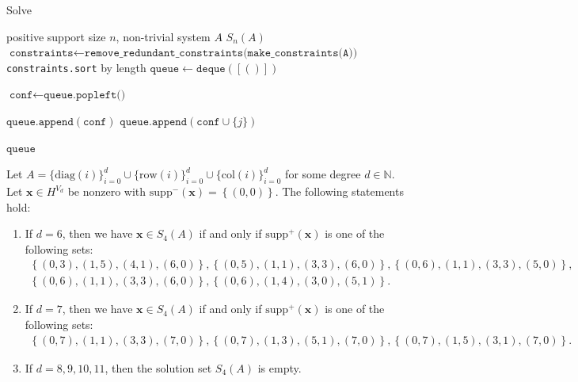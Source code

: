 \begin{algorithm}
\caption{Solve}
\label{alg:solve}
\begin{algorithmic}[1]
\Require positive support size \( n \), non-trivial system \( A \)
\Ensure \( S_n(A) \)
\State $\texttt{constraints} \gets \texttt{remove\_redundant\_constraints(make\_constraints(A))}$
\State \texttt{constraints.sort} by length
\State $\texttt{queue} \gets \texttt{deque}([()])$

        \State $\texttt{conf} \gets \texttt{queue.popleft()}$

            \State $\texttt{queue.append}(\texttt{conf})$
                \State $\texttt{queue.append}(\texttt{conf} \cup \{j\})$
            \EndFor
        \EndIf
    \EndFor
\EndFor

\State \Return $ \texttt{queue}$
\end{algorithmic}
\end{algorithm}
    

\begin{proposition}
    Let $A = \{ \mathrm{diag}(i) \}_{i=0}^d \cup \{ \mathrm{row}(i)\}^d_{i=0} \cup \{ \mathrm{col}(i) \}^d_{i=0}$ for some degree \( d \in \mathbb{N} \). Let \( \mathbf{x} \in H^{V_d} \) be nonzero with \( \mathrm{supp}^-(\mathbf{x}) = \left\{ (0,0) \right\} \). The following statements hold:

    \begin{enumerate}
        \item If \( d = 6 \), then we have \( \mathbf{x} \in S_4(A) \) if and only if \( \mathrm{supp}^+(\mathbf{x}) \) is one of the following sets:
        \begin{gather*}
            \left\{ (0,3), (1,5), (4,1), (6,0) \right\},
            \left\{ (0,5), (1,1), (3,3), (6,0) \right\},
            \left\{ (0,6), (1,1), (3,3), (5,0) \right\},\\
            \left\{ (0,6), (1,1), (3,3), (6,0) \right\},
            \left\{ (0,6), (1,4), (3,0), (5,1) \right\}.
        \end{gather*}
        \item If \( d = 7 \), then we have \( \mathbf{x} \in S_4(A) \) if and only if \( \mathrm{supp}^+(\mathbf{x}) \) is one of the following sets:
        \begin{gather*}
            \left\{ (0,7), (1,1), (3,3), (7,0) \right\},
            \left\{ (0,7), (1,3), (5,1), (7,0) \right\},
            \left\{ (0,7), (1,5), (3,1), (7,0) \right\}.
        \end{gather*}
        \item If \( d = 8, 9 ,10, 11 \), then the solution set \( S_4(A) \) is empty.
    \end{enumerate}
\end{proposition}

